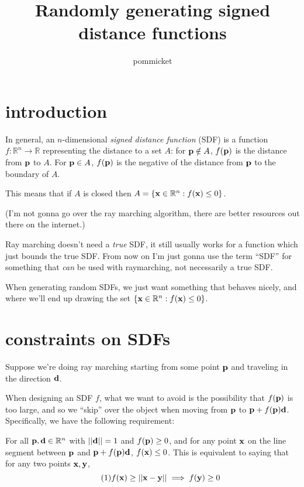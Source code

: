 \documentclass{article}
\title{Randomly generating signed distance functions}
\author{pommicket}
\date{}
\newcommand\bb\mathbb
\renewcommand\vec\textbf
\begin{document}
\maketitle

\section{introduction}

In general, an $n$-dimensional {\em signed distance function} (SDF) is a function
$f:\bb R^n\to\bb R$ representing the distance to a set $A$: for $\vec p\notin A$,
$f(\vec p)$ is the distance from $\vec p$ to $A$. For $\vec p\in A$, $f(\vec p)$ is the
negative of the distance from $\vec p$ to the boundary of $A$.

This means that if $A$ is closed then
$A = \{\vec x\in\bb R^n:f(\vec x)\leq 0\}$.

(I'm not gonna go over the ray marching algorithm, there are better resources out there on
the internet.)

Ray marching doesn't need a {\em true} SDF, it still usually works
for a function which just bounds the true SDF.
From now on I'm just gonna use the term ``SDF'' for something that {\em can} be used with raymarching,
not necessarily a true SDF.

When generating random SDFs,
we just want something that behaves nicely, and where we'll end up drawing the set
$\{\vec x\in\bb R^n:f(\vec x) \leq 0\}$.

\section{constraints on SDFs}
Suppose we're doing ray marching starting from 
some point $\vec p$ and traveling in the direction $\vec d$.

When designing an SDF $f$, what we want to avoid is the possibility
that $f(\vec p)$ is too  large, and so we ``skip'' over
the object when moving from $\vec p$ to $\vec p + f(\vec p) \vec d$.
Specifically, we have the following requirement:

For all $\vec p,\vec d\in \bb R^n$
with $||\vec d||=1$ and $f(\vec p)\geq 0$,
and for any point $\vec x$ on the line segment between
$\vec p$ and $\vec p + f(\vec p) \vec d$, $f(\vec x) \leq 0$.
This is equivalent to saying that for any two points $\vec x,\vec y$,
\begin{equation*}
\tag{1}
f(\vec x)\geq ||\vec x-\vec y|| \implies f(\vec  y) \geq 0
\end{equation*}
\end{document}
